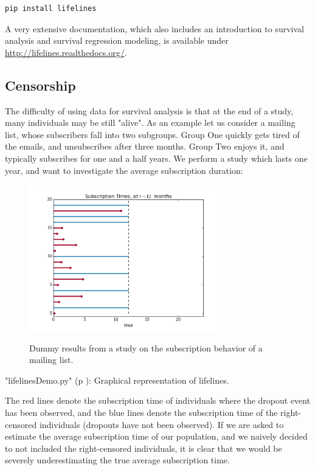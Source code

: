 \begin{lstlisting}[language=Python]
  pip install lifelines
\end{lstlisting}

 A very extensive documentation, which also includes an introduction to survival analysis and survival regression modeling, is available under \url{http://lifelines.readthedocs.org/}.

\subsection{Censorship}

The difficulty of using data for survival analysis is that at the end of a study, many individuals may be still "alive". As an example let us consider a mailing list, whose subscribers fall into two subgroups. Group One quickly gets tired of the emails, and unsubscribes after three months. Group Two enjoys it, and typically subscribes for one and a half years. We perform a study which lasts one year, and want to investigate the average subscription duration:

\begin{figure}[H]
  \centering
  \includegraphics[width=0.75\textwidth]{../Images/lifelines.png}\\
  \caption{Dummy results from a study on the subscription behavior of a mailing list.}\label{fig:lifelines}
\end{figure}

\PyImg "lifelinesDemo.py" (p \pageref{py:lifelines}): Graphical representation of lifelines.

The red lines denote the subscription time of individuals where the dropout event has been observed, and the blue lines denote the subscription time of the right-censored individuals (dropouts have not been observed). If we are asked to estimate the average subscription time of our population, and we naively decided to not included the right-censored individuals, it is clear that we would be severely underestimating the true average subscription time.

